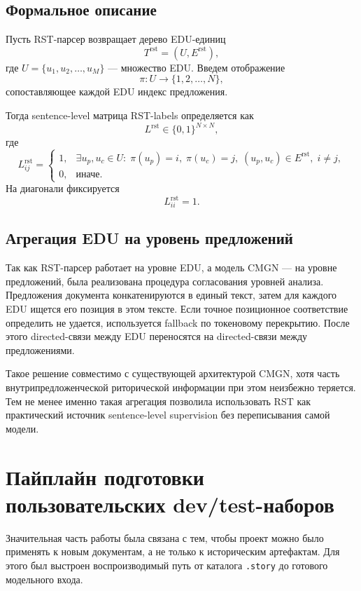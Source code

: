 \documentclass[12pt,a4paper]{article}
\begin{document}
\subsection{Формальное описание}

Пусть RST-парсер возвращает дерево EDU-единиц
\[
T^{\text{rst}} = (U, E^{\text{rst}}),
\]
где $U = \{u_1, u_2, \dots, u_M\}$ --- множество EDU. Введем отображение
\[
\pi: U \rightarrow \{1,2,\dots,N\},
\]
сопоставляющее каждой EDU индекс предложения.

Тогда sentence-level матрица RST-labels определяется как
\[
L^{\text{rst}} \in \{0,1\}^{N \times N},
\]
где
\[
L^{\text{rst}}_{ij} =
\begin{cases}
1, & \exists u_p, u_c \in U:\; \pi(u_p)=i,\; \pi(u_c)=j,\; (u_p,u_c)\in E^{\text{rst}},\; i \neq j,\\
0, & \text{иначе.}
\end{cases}
\]
На диагонали фиксируется
\[
L^{\text{rst}}_{ii}=1.
\]

\subsection{Агрегация EDU на уровень предложений}

Так как RST-парсер работает на уровне EDU, а модель CMGN --- на уровне предложений, была реализована процедура согласования уровней анализа. Предложения документа конкатенируются в единый текст, затем для каждого EDU ищется его позиция в этом тексте. Если точное позиционное соответствие определить не удается, используется fallback по токеновому перекрытию. После этого directed-связи между EDU переносятся на directed-связи между предложениями.

Такое решение совместимо с существующей архитектурой CMGN, хотя часть внутрипредложенческой риторической информации при этом неизбежно теряется. Тем не менее именно такая агрегация позволила использовать RST как практический источник sentence-level supervision без переписывания самой модели.

\section{Пайплайн подготовки пользовательских dev/test-наборов}

Значительная часть работы была связана с тем, чтобы проект можно было применять к новым документам, а не только к историческим артефактам. Для этого был выстроен воспроизводимый путь от каталога \texttt{.story} до готового модельного входа.
\end{document}
